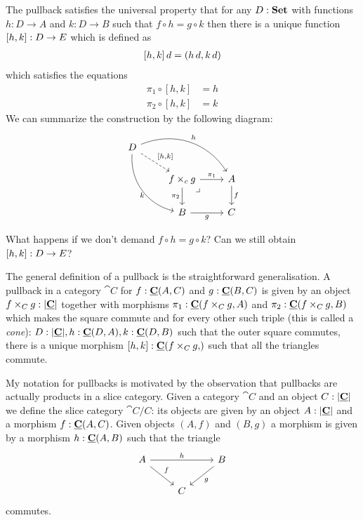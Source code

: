 The pullback satisfies the universal property that for any $D : \mathbf{Set}$ with functions $h : D \to A$ and $k : D \to B$ such that $f \circ h = g \circ k$ then there is a unique function $[h,k] : D \to E$ which is defined as
\begin{align*}
[h,k] \, d = (h\,d , k\, d) 
\end{align*}
which satisfies the equations
\begin{align*}
\pi_1 \circ [h , k] & = h \\
\pi_2 \circ [h , k] & = k
\end{align*}
We can summarize the construction by the following diagram:
\[\begin{tikzcd}
D \arrow[rrd,bend left = 40,"h"] \arrow[ddr,bend right = 40,"k" below]
\arrow[rd,dashrightarrow,"\pair{h}{k}"] \\
&  f \times_c g \arrow[r,"\pi_1"] \arrow[d,"\pi_2" left] \arrow[dr, phantom, "\lrcorner", very near start]
    & A \arrow[d,"f"] \\
&  B \arrow[r,"g" below] &C 
\end{tikzcd}\]

\begin{Exercise}
  What happens if we don't demand $f \circ h = g \circ k$? Can we still obtain $[h,k] : D \to E$?
\end{Exercise}

The general definition of a pullback is the straightforward generalisation. A pullback in a category $\cat{C}$ for $f : \underline{\mathbf{C}}(A,C)$ and $g : \underline{\mathbf{C}}(B,C)$ is given by an object $f \times_C g :|\underline{\mathbf{C}}|$ together with morphisms $\pi_1 : \underline{\mathbf{C}}(f \times_C g,A)$ and $\pi_2 : \underline{\mathbf{C}}(f \times_C g,B)$ which makes the square commute and for every other such triple (this is called a \emph{cone}): $D : |\underline{\mathbf{C}}|, h : \underline{\mathbf{C}}(D,A), k :  \underline{\mathbf{C}}(D,B)$ such that the outer square commutes, there is a unique morphism $\pair{h}{k} : \homC{C}{f \times_C g}$ such that all the triangles commute.

My notation for pullbacks is motivated by the observation that pullbacks are actually products in a slice category. Given a category $\cat{C}$ and an object $C : |\underline{\mathbf{C}}|$ we define the slice category $\cat{C}/C$: its objects are given by an object $A:|\underline{\mathbf{C}}|$ and a morphism $f : \underline{\mathbf{C}}(A,C)$. Given objects $(A,f)$ and $(B,g)$ a morphism is given by a morphism $h : \underline{\mathbf{C}}(A,B)$ such that the triangle
\[\begin{tikzcd}
  A \arrow[dr,"f"] \arrow[rr,"h"]& & B \arrow[dl,"g"] \\
& C
\end{tikzcd}\]
commutes.

